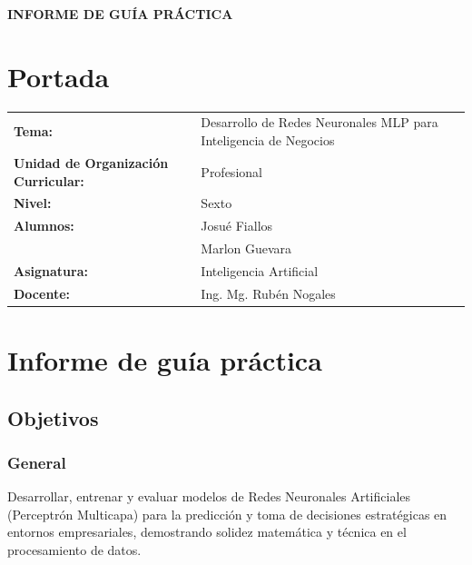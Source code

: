 \documentclass{article}
\begin{document}
\begin{center}
    {\large \textbf{INFORME DE GUÍA PRÁCTICA}} \\    
\end{center}

\section{Portada}
\begin{flushleft}
\begin{tabular}{ l l }
    \textbf{Tema:} & Desarrollo de Redes Neuronales MLP para Inteligencia de Negocios\\
    \textbf{Unidad de Organización Curricular:} & Profesional \\
    \textbf{Nivel:} & Sexto \\
    \textbf{Alumnos:}
                    & Josué Fiallos \\
                    & Marlon Guevara \\
                    
    \textbf{Asignatura:} & Inteligencia Artificial \\
    \textbf{Docente:} & Ing. Mg. Rubén Nogales \\
\end{tabular}
\end{flushleft}

\section{Informe de guía práctica}
\subsection{Objetivos}
\subsubsection{General}
Desarrollar, entrenar y evaluar modelos de Redes Neuronales Artificiales (Perceptrón Multicapa) para la predicción y toma de decisiones estratégicas en entornos empresariales, demostrando solidez matemática y técnica en el procesamiento de datos.
\end{document}
